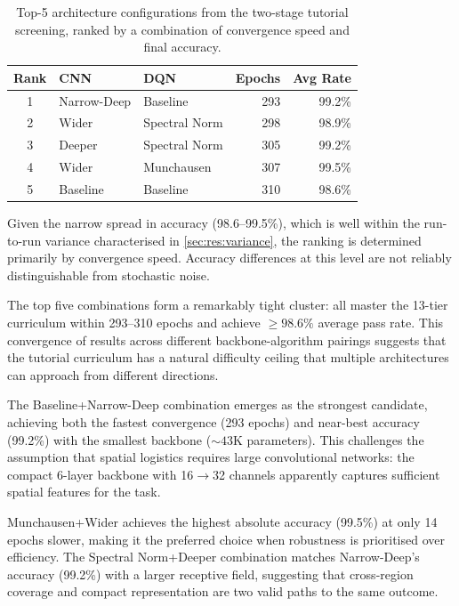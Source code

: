 \begin{table}[H]
  \centering
  \caption{Top-5 architecture configurations from the two-stage tutorial screening, ranked by a combination of convergence speed and final accuracy.}
  \label{tab:res:final_ranking}
  \begin{tabular}{@{} c l l r r @{}}
    \toprule
    \textbf{Rank} & \textbf{CNN} & \textbf{DQN} & \textbf{Epochs} & \textbf{Avg Rate} \\
    \midrule
    1 & Narrow-Deep   & Baseline      & 293 & 99.2\% \\
    2 & Wider         & Spectral Norm & 298 & 98.9\% \\
    3 & Deeper        & Spectral Norm & 305 & 99.2\% \\
    4 & Wider         & Munchausen    & 307 & 99.5\% \\
    5 & Baseline      & Baseline      & 310 & 98.6\% \\
    \bottomrule
  \end{tabular}
\end{table}
Given the narrow spread in accuracy (98.6–99.5\%), which is well within the run-to-run variance characterised in \cref{sec:res:variance}, the ranking is determined primarily by convergence speed. Accuracy differences at this level are not reliably distinguishable from stochastic noise.

The top five combinations form a remarkably tight cluster: all master the 13-tier curriculum within 293--310 epochs and achieve $\geq 98.6\%$ average pass rate. This convergence of results across different backbone-algorithm pairings suggests that the tutorial curriculum has a natural difficulty ceiling that multiple architectures can approach from different directions.

The Baseline+Narrow-Deep combination emerges as the strongest candidate, achieving both the fastest convergence (293 epochs) and near-best accuracy (99.2\%) with the smallest backbone (${\sim}43$K parameters). This challenges the assumption that spatial logistics requires large convolutional networks: the compact 6-layer backbone with 16$\to$32 channels apparently captures sufficient spatial features for the task.

Munchausen+Wider achieves the highest absolute accuracy (99.5\%) at only 14 epochs slower, making it the preferred choice when robustness is prioritised over efficiency. The Spectral Norm+Deeper combination matches Narrow-Deep's accuracy (99.2\%) with a larger receptive field, suggesting that cross-region coverage and compact representation are two valid paths to the same outcome.

